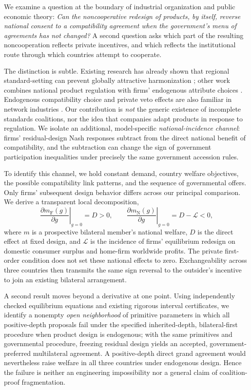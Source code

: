 \documentclass[11pt,a4paper]{article}
\theoremstyle{remark}\newtheorem{remark}[theorem]{Remark}
\newcommand{\N}{\mathrm{N}}\newcommand{\F}{\mathrm{F}}
\newcommand{\loss}{\mathcal L}\newcommand{\vect}[1]{\boldsymbol{#1}}
\begin{document}
We examine a question at the boundary of industrial organization and public economic theory: \emph{Can the noncooperative redesign of products, by itself, reverse national consent to a compatibility agreement when the government's menu of agreements has not changed?} A second question asks which part of the resulting noncooperation reflects private incentives, and which reflects the institutional route through which countries attempt to cooperate.

The distinction is subtle. Existing research has already shown that regional standard-setting can prevent globally attractive harmonization \citep{Takarada2020,Kawabata2021}; other work combines national product regulation with firms' endogenous attribute choices \citep{Grossman2021}. Endogenous compatibility choice and private veto effects are also familiar in network industries \citep{Buccella2023,Cheng2025}. Our contribution is \emph{not} the generic existence of incomplete standards coalitions, nor the idea that companies adapt products in response to regulation. We isolate an additional, model-specific \emph{national-incidence channel}: firms' residual-design Nash responses subtract from the direct national benefit of compatibility, and the subtraction can change the sign of government participation inequalities under precisely the same government accession rules.

To identify this channel, we hold constant demand, country welfare objectives, the possible compatibility link patterns, and the sequence of governmental offers. Only firms' subsequent design behavior differs across our principal comparison. We derive a transparent local decomposition,
\begin{equation}\label{eq:introheadline}
\left.\frac{\partial m_{\F}(g)}{\partial g}\right|_{g=0}=D>0,\qquad
\left.\frac{\partial m_{\N}(g)}{\partial g}\right|_{g=0}=D-\loss<0,
\end{equation}
where $m$ is a prospective bilateral member's national welfare, $D$ is the direct effect at fixed design, and $\loss$ is the incidence of firms' equilibrium redesign on domestic consumer surplus and home-firm worldwide profits. The private first-order condition does not set these national effects to zero. Exchangeability across three countries then transmits the same sign reversal to the outsider's incentive to join an existing bilateral arrangement.

A second result moves beyond a derivative at one point. Using independently checked equilibrium equations and existing rigorous interval certificates, we identify a nonempty \emph{open neighborhood} of primitive parameters in which all positive-depth proposals fail under the specified inherited-depth, bilateral-first procedure when product design is endogenous; with the same primitives and governmental procedure, freezing residual design yields an accepted, government-preferred multilateral agreement. A positive-depth direct grand agreement would nevertheless raise welfare in all three countries under endogenous design. Hence the failure is neither an engineering impossibility nor a general claim of coalition-proof fragmentation.
\end{document}
